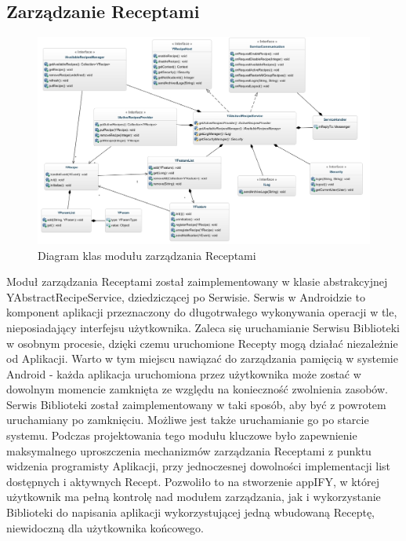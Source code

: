 \documentclass[11pt,a4paper,polish,thesis]{dcsbook}
\begin{document}
\subsection{Zarządzanie Receptami}
\begin{figure}[H]
  \centering
  \hspace*{-0.9in}
  \includegraphics[scale=0.6]{./resources/service_uml.png}
  \caption{Diagram klas modułu zarządzania Receptami}
  \label{fig:service_uml}
\end{figure}
Moduł zarządzania Receptami został zaimplementowany w klasie abstrakcyjnej YAbstractRecipeService, dziedziczącej po Serwisie.
Serwis w Androidzie to komponent aplikacji przeznaczony do długotrwałego wykonywania operacji w tle, nieposiadający interfejsu użytkownika. \cite{android.serwis}
Zaleca się uruchamianie Serwisu Biblioteki w osobnym procesie, dzięki czemu uruchomione Recepty mogą działać niezależnie od Aplikacji. Warto w tym miejscu nawiązać do zarządzania pamięcią w systemie Android - każda aplikacja uruchomiona przez użytkownika może zostać w dowolnym momencie zamknięta ze względu na konieczność zwolnienia zasobów. Serwis Biblioteki został zaimplementowany w taki sposób, aby być z powrotem uruchamiany po zamknięciu. Możliwe jest także uruchamianie go po starcie systemu.
Podczas projektowania tego modułu kluczowe było zapewnienie maksymalnego uproszczenia mechanizmów zarządzania Receptami z punktu widzenia programisty Aplikacji, przy jednoczesnej dowolności implementacji list dostępnych i aktywnych Recept. Pozwoliło to na stworzenie appIFY, w której użytkownik ma pełną kontrolę nad modułem zarządzania, jak i wykorzystanie Biblioteki do napisania aplikacji wykorzystującej jedną wbudowaną Receptę, niewidoczną dla użytkownika końcowego.
\end{document}
